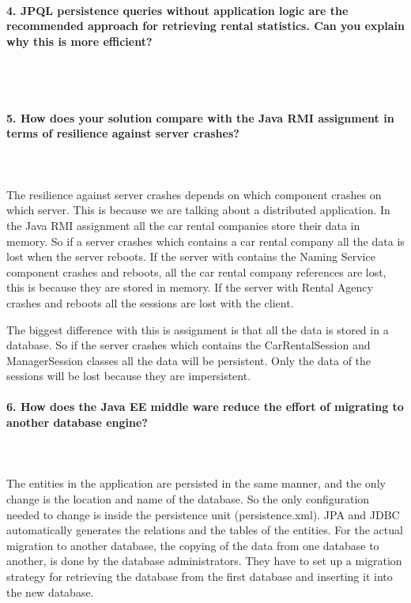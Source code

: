 \documentclass{ds-report}
\begin{document}
	\paragraph{4. JPQL persistence queries without application logic are the recommended approach for retrieving rental statistics. Can you explain why this is more efficient?} \mbox{}\\\\





	\paragraph{5. How does your solution compare with the Java RMI assignment in terms of resilience against server crashes?} \mbox{}\\\\
The resilience against server crashes depends on which component crashes on which server. This is because we are talking about a distributed application. In the Java RMI assignment all the car rental companies store their data in memory. So if a server crashes which contains a car rental company all the data is lost when the server reboots. If the server with contains the Naming Service component crashes and reboots, all the car rental company references are lost, this is because they are stored in memory. If the server with Rental Agency crashes and reboots all the sessions are lost with the client.

The biggest difference with this is assignment is that all the data is stored in a database. So if the server crashes which contains the CarRentalSession and ManagerSession classes all the data will be persistent. Only the data of the sessions will be lost because they are impersistent.


		\paragraph{6. How does the Java EE middle ware reduce the effort of migrating to another database engine?} \mbox{}\\\\
The entities in the application are persisted in the same manner, and the only change is the location and name of the database. So the only configuration needed to change is inside the persistence unit (persistence.xml). JPA and JDBC automatically generates the relations and the tables of the entities.  
For the actual migration to another database, the copying of the data from one database to another, is done by the database administrators. They have to set up a migration strategy for retrieving the database from the first database and inserting it into the new database. 
\end{document}
